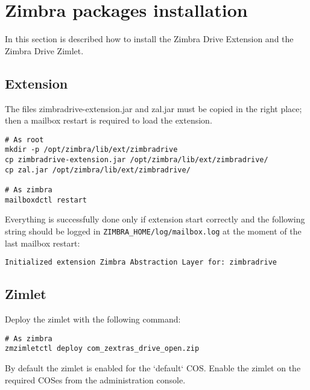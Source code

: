 \section{Zimbra packages installation}

In this section is described how to install the Zimbra Drive Extension and the Zimbra Drive Zimlet.
\subsection{Extension}
    The files zimbradrive-extension.jar and zal.jar must be copied in the right place;
    then a mailbox restart is required to load the extension.
    \begin{verbatim}
# As root
mkdir -p /opt/zimbra/lib/ext/zimbradrive
cp zimbradrive-extension.jar /opt/zimbra/lib/ext/zimbradrive/
cp zal.jar /opt/zimbra/lib/ext/zimbradrive/

# As zimbra
mailboxdctl restart
    \end{verbatim}
    Everything is successfully done only if extension start correctly and the following string
    should be logged in \texttt{ZIMBRA\_HOME/log/mailbox.log} at the moment of the last mailbox restart:
    \begin{verbatim}
Initialized extension Zimbra Abstraction Layer for: zimbradrive
    \end{verbatim}

\subsection{Zimlet}
    Deploy the zimlet with the following command:
    \begin{verbatim}
# As zimbra
zmzimletctl deploy com_zextras_drive_open.zip
    \end{verbatim}
    By default the zimlet is enabled for the `default` COS.
    Enable the zimlet on the required COSes from the administration console.
